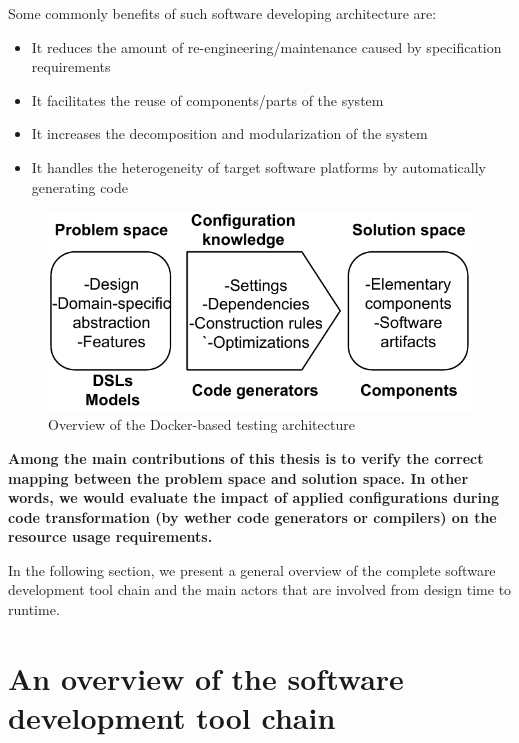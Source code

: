 Some commonly benefits of such software developing architecture are:
\begin{itemize}
\item It reduces the amount of re-engineering/maintenance caused by specification requirements
\item It facilitates the reuse of components/parts of the system
\item It increases the decomposition and modularization of the system
\item It handles the heterogeneity of target software platforms by automatically generating code
\end{itemize}
\begin{figure}[h]
	\center
	\includegraphics[scale=0.65]{Background/fig/GDM.pdf}
	\caption{Overview of the Docker-based testing architecture}
\end{figure}

\textbf{Among the main contributions of this thesis is to verify the correct mapping between the problem space and solution space. In other words, we would evaluate the impact of applied configurations during code transformation (by wether code generators or compilers) on the resource usage requirements.
}

In the following section, we present a general overview of the complete software development tool chain and the main actors that are involved from design time to runtime.


\section{An overview of the software development tool chain}
